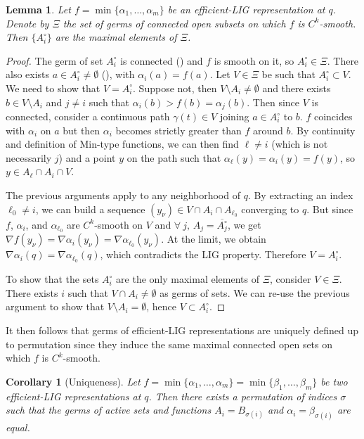 \documentclass[11pt]{article}
\newcommand{\inter}{\cap}
\newcommand{\grad}{\nabla}
\theoremstyle{plain}
\newtheorem{lem}{Lemma}
\newtheorem{cor}{Corollary}
\theoremstyle{definition}
\theoremstyle{remark}
\begin{document}
\begin{lem}
	\label{lem:active_sets_maximal}
	Let $f = \min \{\alpha_1,\ldots,\alpha_m\}$ be an efficient-LIG representation at $q$. Denote by $\Xi$ the set of germs of connected open subsets on which $f$ is $C^k$-smooth.
	Then $\{A_i^\circ\}$ are the maximal elements of $\Xi$.
\end{lem}
\begin{proof}
	The germ of set $A_i^\circ$ is connected () and $f$ is smooth on it, so $A_i^\circ \in \Xi$. There also exists $a \in A_i^\circ \neq \emptyset$ (), with $\alpha_i(a) = f(a)$.
	Let $V \in \Xi$ be such that $A_i^\circ \subset V$. We need to show that $V = A_i^\circ$.  Suppose not, then $V \setminus A_i \neq \emptyset$ and there exists $b \in V \setminus A_i$ and $j \neq i$ such that $\alpha_i(b) > f(b) = \alpha_j(b)$.
	Then since $V$ is connected, consider a continuous path $\gamma(t) \in V$ joining $a \in A_i^\circ$ to $b$. $f$ coincides with $\alpha_i$ on $a$ but then $\alpha_i$ becomes strictly greater than $f$ around $b$. By continuity and definition of Min-type functions, we can then find $\ell \neq i$ (which is not necessarily $j$) and a point $y$ on the path such that $\alpha_\ell(y) = \alpha_i(y) = f(y)$, so $y \in A_\ell \inter A_i \inter V$.
	
	The previous arguments apply to any neighborhood of $q$. By extracting an index $\ell_0 \neq i$, we can build a sequence $(y_\nu) \in V \inter A_i \inter A_{\ell_0}$ converging to $q$. But since $f$, $\alpha_i$, and $\alpha_{\ell_0}$ are $C^k$-smooth on $V$ and $\forall\ j,\, A_j = \overline{A_j^\circ}$, we get $\grad f(y_\nu) = \grad \alpha_i(y_\nu) = \grad \alpha_{\ell_0}(y_\nu)$. At the limit, we obtain $\grad \alpha_i(q) = \grad \alpha_{\ell_0}(q)$, which contradicts the LIG property. Therefore $V = A_i^\circ$.
	
	To show that the sets $A_i^\circ$ are the only maximal elements of $\Xi$, consider $V \in \Xi$. There exists $i$ such that $V \inter A_i \neq \emptyset$ as germs of sets. We can re-use the previous argument to show that $V \setminus A_i = \emptyset$, hence $V \subset A_i^\circ$.
\end{proof}

It then follows that germs of efficient-LIG representations are uniquely defined up to permutation since they induce the same maximal connected open sets on which $f$ is $C^k$-smooth.
\begin{cor}[Uniqueness]
	\label{cor:uniqueness_minirep}
	Let $f = \min \{\alpha_1,\ldots,\alpha_m\} = \min \{\beta_1,\ldots,\beta_m\}$ be two efficient-LIG representations at $q$. Then there exists a permutation of indices $\sigma$ such that the germs of active sets and functions $A_i = B_{\sigma(i)}$ and $\alpha_i = \beta_{\sigma(i)}$ are equal.
\end{cor}
\end{document}
